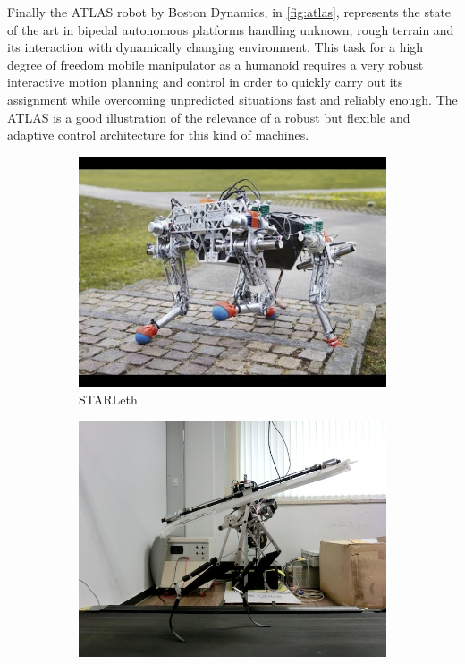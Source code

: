 Finally the ATLAS robot by Boston Dynamics, in \ref{fig:atlas}, represents the state of the art in bipedal autonomous platforms handling unknown, rough terrain and its interaction with dynamically changing environment.
This task for a high degree of freedom mobile manipulator as a humanoid requires a very robust interactive motion planning and control in order to quickly carry out its assignment while overcoming unpredicted situations fast and reliably enough.
The ATLAS is a good illustration of the relevance of a robust but flexible and adaptive control architecture for this kind of machines.


\begin{figure}[h]
\label{fig:biped_robots}
	\centering
    \begin{subfigure}[b]{0.32\textwidth}
        \includegraphics[width=\textwidth]{figures/starleth.jpg}
        \caption{STARLeth}
        \label{fig:starleth}
    \end{subfigure}
    \centering
    \begin{subfigure}[b]{0.32\textwidth}
        \includegraphics[width=\textwidth]{figures/biped_kaist.jpg}

\end{subfigure}
\end{figure}
